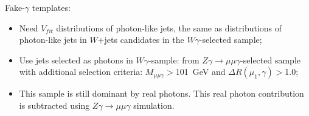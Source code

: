 \begin{frame}
Fake-$\gamma$ templates:
  \begin{itemize}
     \tiny
     \item Need $V_{fit}$ distributions of photon-like jets, the same as distributions of photon-like jets in $W$+jets candidates in the $W\gamma$-selected sample;
     \item Use jets selected as photons in $W\gamma$-sample: from $Z\gamma \rightarrow \mu\mu\gamma$-selected sample with additional selection criteria: $M_{\mu\mu\gamma}>$101~GeV and $\Delta R(\mu_{1},\gamma)>$1.0;
     \item This sample is still dominant by real photons. This real photon contribution is subtracted using $Z\gamma \rightarrow \mu\mu\gamma$ simulation.
  \end{itemize}

\end{frame}%
